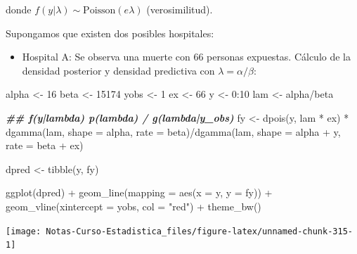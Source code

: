\documentclass[
  12pt,
]{book}
\newenvironment{Shaded}{\begin{snugshade}}{\end{snugshade}}
\newcommand{\AttributeTok}[1]{\textcolor[rgb]{0.77,0.63,0.00}{#1}}
\newcommand{\DecValTok}[1]{\textcolor[rgb]{0.00,0.00,0.81}{#1}}
\newcommand{\DocumentationTok}[1]{\textcolor[rgb]{0.56,0.35,0.01}{\textbf{\textit{#1}}}}
\newcommand{\FunctionTok}[1]{\textcolor[rgb]{0.00,0.00,0.00}{#1}}
\newcommand{\NormalTok}[1]{#1}
\newcommand{\OtherTok}[1]{\textcolor[rgb]{0.56,0.35,0.01}{#1}}
\newcommand{\SpecialCharTok}[1]{\textcolor[rgb]{0.00,0.00,0.00}{#1}}
\newcommand{\StringTok}[1]{\textcolor[rgb]{0.31,0.60,0.02}{#1}}
\providecommand{\tightlist}{%
  \setlength{\itemsep}{0pt}\setlength{\parskip}{0pt}}
\theoremstyle{definition}
\theoremstyle{definition}
\theoremstyle{definition}
\theoremstyle{definition}
\theoremstyle{remark}
\begin{document}
donde \(f(y|\lambda)\sim \text{Poisson}(e\lambda)\) (verosimilitud).

Supongamos que existen dos posibles hospitales:

\begin{itemize}
\tightlist
\item
  Hospital A: Se observa una muerte con 66 personas expuestas. Cálculo de la densidad posterior y densidad predictiva con \(\lambda = \alpha/\beta\):
\end{itemize}

\begin{Shaded}
\begin{Highlighting}[]
\NormalTok{alpha }\OtherTok{\textless{}{-}} \DecValTok{16}
\NormalTok{beta }\OtherTok{\textless{}{-}} \DecValTok{15174}
\NormalTok{yobs }\OtherTok{\textless{}{-}} \DecValTok{1}
\NormalTok{ex }\OtherTok{\textless{}{-}} \DecValTok{66}
\NormalTok{y }\OtherTok{\textless{}{-}} \DecValTok{0}\SpecialCharTok{:}\DecValTok{10}
\NormalTok{lam }\OtherTok{\textless{}{-}}\NormalTok{ alpha}\SpecialCharTok{/}\NormalTok{beta}

\DocumentationTok{\#\# f(y|lambda) p(lambda) / g(lambda|y\_obs)}
\NormalTok{fy }\OtherTok{\textless{}{-}} \FunctionTok{dpois}\NormalTok{(y, lam }\SpecialCharTok{*}\NormalTok{ ex) }\SpecialCharTok{*} \FunctionTok{dgamma}\NormalTok{(lam, }\AttributeTok{shape =}\NormalTok{ alpha,}
    \AttributeTok{rate =}\NormalTok{ beta)}\SpecialCharTok{/}\FunctionTok{dgamma}\NormalTok{(lam, }\AttributeTok{shape =}\NormalTok{ alpha }\SpecialCharTok{+}\NormalTok{ y, }\AttributeTok{rate =}\NormalTok{ beta }\SpecialCharTok{+}
\NormalTok{    ex)}

\NormalTok{dpred }\OtherTok{\textless{}{-}} \FunctionTok{tibble}\NormalTok{(y, fy)}

\FunctionTok{ggplot}\NormalTok{(dpred) }\SpecialCharTok{+} \FunctionTok{geom\_line}\NormalTok{(}\AttributeTok{mapping =} \FunctionTok{aes}\NormalTok{(}\AttributeTok{x =}\NormalTok{ y, }\AttributeTok{y =}\NormalTok{ fy)) }\SpecialCharTok{+}
    \FunctionTok{geom\_vline}\NormalTok{(}\AttributeTok{xintercept =}\NormalTok{ yobs, }\AttributeTok{col =} \StringTok{"red"}\NormalTok{) }\SpecialCharTok{+} \FunctionTok{theme\_bw}\NormalTok{()}
\end{Highlighting}
\end{Shaded}

\begin{center}\texttt{[image: Notas-Curso-Estadistica\_files/figure-latex/unnamed-chunk-315-1]} \end{center}
\end{document}
